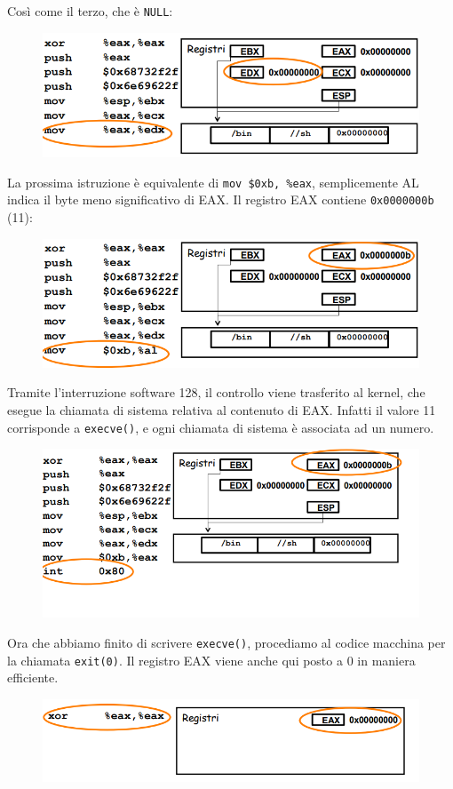 Così come il terzo, che è \texttt{NULL}:

\begin{figure}[hbpt!]
    \centering
    \includegraphics[width= 0.5 \textwidth]{./Images/cap8/8.7.png}
\end{figure}
\FloatBarrier

La prossima istruzione è equivalente di \texttt{mov \$0xb, \%eax}, semplicemente AL indica il byte meno significativo di EAX. Il registro EAX contiene \texttt{0x0000000b} (11):

\begin{figure}[hbpt!]
    \centering
    \includegraphics[width= 0.5 \textwidth]{./Images/cap8/8.8.png}
\end{figure}
\FloatBarrier

Tramite l'interruzione software 128, il controllo viene trasferito al kernel, che esegue la chiamata di sistema relativa al contenuto di EAX. Infatti il valore 11 corrisponde a \texttt{execve()}, e ogni chiamata di sistema è associata ad un numero.

\begin{figure}[hbpt!]
    \centering
    \includegraphics[width= 0.5 \textwidth]{./Images/cap8/8.9.png}
\end{figure}
\FloatBarrier

Ora che abbiamo finito di scrivere \texttt{execve()}, procediamo al codice macchina per la chiamata \texttt{exit(0)}. Il registro EAX viene anche qui posto a 0 in maniera efficiente.

\begin{figure}[hbpt!]
    \centering
    \includegraphics[width= 0.5 \textwidth]{./Images/cap8/8.1.png}
\end{figure}
\FloatBarrier

